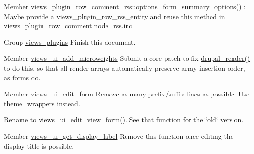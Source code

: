 \label{todo__todo000081}
\hypertarget{todo__todo000081}{}
 
\begin{DoxyDescription}
\item[Member \hyperlink{classviews__plugin__row__comment__rss_a62f1381c8f5def6a790685208be61dae}{views\_\-plugin\_\-row\_\-comment\_\-rss::options\_\-form\_\-summary\_\-options}() ]: Maybe provide a views\_\-plugin\_\-row\_\-rss\_\-entity and reuse this method in views\_\-plugin\_\-row\_\-comment$|$node\_\-rss.inc 
\end{DoxyDescription}

\label{todo__todo000088}
\hypertarget{todo__todo000088}{}
 
\begin{DoxyDescription}
\item[Group \hyperlink{group__views__plugins}{views\_\-plugins} ]Finish this document.


\end{DoxyDescription}

\label{todo__todo000078}
\hypertarget{todo__todo000078}{}
 
\begin{DoxyDescription}
\item[Member \hyperlink{admin_8inc_a21c22d965161a3efb6b1f10570d3f9cd}{views\_\-ui\_\-add\_\-microweights} ]Submit a core patch to fix \hyperlink{common_8inc_a05798b44e8d6c496d4bee5cc32fa7851}{drupal\_\-render()} to do this, so that all render arrays automatically preserve array insertion order, as forms do. 
\end{DoxyDescription}

\label{todo__todo000076}
\hypertarget{todo__todo000076}{}
 
\begin{DoxyDescription}
\item[Member \hyperlink{admin_8inc_a3c7bbae87e55e6a531c04c8135bd1231}{views\_\-ui\_\-edit\_\-form} ]Remove as many prefix/suffix lines as possible. Use theme\_\-wrappers instead.



Rename to views\_\-ui\_\-edit\_\-view\_\-form(). See that function for the \char`\"{}old\char`\"{} version.


\end{DoxyDescription}

\label{todo__todo000079}
\hypertarget{todo__todo000079}{}
 
\begin{DoxyDescription}
\item[Member \hyperlink{admin_8inc_a20b56808cc1c748e9a5d95b0753367b2}{views\_\-ui\_\-get\_\-display\_\-label} ]Remove this function once editing the display title is possible. 
\end{DoxyDescription}

